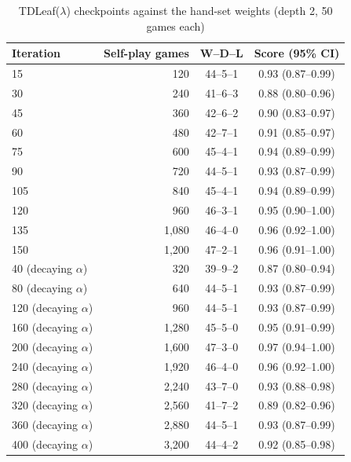 \begin{table}[!htbp]
\centering\caption{TDLeaf($\lambda$) checkpoints against the hand-set weights (depth 2, 50 games each)}\label{tab:curve}
\footnotesize
\begin{tabular}{@{}lrcc@{}}
\toprule
Iteration & Self-play games & W--D--L & Score (95\% CI) \\
\midrule
15 & 120 & 44--5--1 & 0.93 (0.87--0.99) \\
30 & 240 & 41--6--3 & 0.88 (0.80--0.96) \\
45 & 360 & 42--6--2 & 0.90 (0.83--0.97) \\
60 & 480 & 42--7--1 & 0.91 (0.85--0.97) \\
75 & 600 & 45--4--1 & 0.94 (0.89--0.99) \\
90 & 720 & 44--5--1 & 0.93 (0.87--0.99) \\
105 & 840 & 45--4--1 & 0.94 (0.89--0.99) \\
120 & 960 & 46--3--1 & 0.95 (0.90--1.00) \\
135 & 1,080 & 46--4--0 & 0.96 (0.92--1.00) \\
150 & 1,200 & 47--2--1 & 0.96 (0.91--1.00) \\
\midrule
40 (decaying $\alpha$) & 320 & 39--9--2 & 0.87 (0.80--0.94) \\
80 (decaying $\alpha$) & 640 & 44--5--1 & 0.93 (0.87--0.99) \\
120 (decaying $\alpha$) & 960 & 44--5--1 & 0.93 (0.87--0.99) \\
160 (decaying $\alpha$) & 1,280 & 45--5--0 & 0.95 (0.91--0.99) \\
200 (decaying $\alpha$) & 1,600 & 47--3--0 & 0.97 (0.94--1.00) \\
240 (decaying $\alpha$) & 1,920 & 46--4--0 & 0.96 (0.92--1.00) \\
280 (decaying $\alpha$) & 2,240 & 43--7--0 & 0.93 (0.88--0.98) \\
320 (decaying $\alpha$) & 2,560 & 41--7--2 & 0.89 (0.82--0.96) \\
360 (decaying $\alpha$) & 2,880 & 44--5--1 & 0.93 (0.87--0.99) \\
400 (decaying $\alpha$) & 3,200 & 44--4--2 & 0.92 (0.85--0.98) \\
\bottomrule
\end{tabular}
\par\vspace{2pt}{\scriptsize Top: the 1,200-game run of the final agent ($\alpha=10$). Bottom: the 3,200-game convergence run, seed 1, step size $\alpha_t = 10/(1+(t-1)/200)$.}
\end{table}
